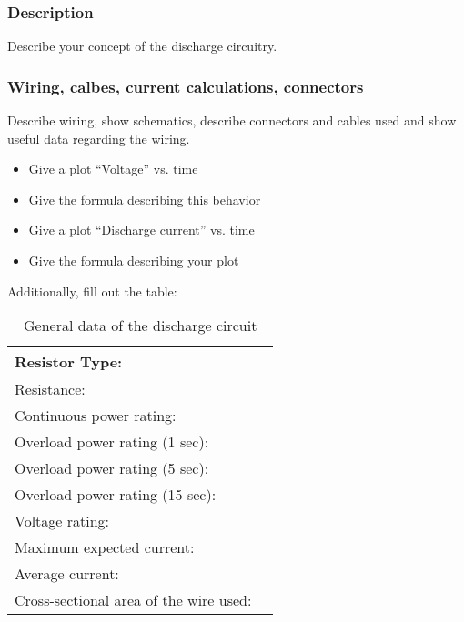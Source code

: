 \subsubsection{Description}
Describe your concept of the discharge circuitry.

\subsubsection{Wiring, calbes, current calculations, connectors}
Describe wiring, show schematics, describe connectors and cables used and show useful data regarding the wiring.
\begin{itemize}
	\item 	Give a plot “Voltage” vs. time
	\item 	Give the formula describing this behavior
	\item 	Give a plot “Discharge current” vs. time
	\item 	Give the formula describing your plot
\end{itemize}
Additionally, fill out the table:

\begin{table}[H]
	\centering
	\caption{General data of the discharge circuit}
	\begin{tabularx}{\textwidth}{|X|X|}
		\hline
		Resistor Type: &\\[\TableSize]
		\hline
		Resistance: & \\[\TableSize]
		\hline
		Continuous power rating: & \\[\TableSize]
		\hline
		Overload power rating (1 sec): & \\[\TableSize]
		\hline
		Overload power rating (5 sec): &  \\[\TableSize]
		\hline
		Overload power rating (15 sec): &  \\[\TableSize]
		\hline
		Voltage rating: &\\[\TableSize]
		\hline
		Maximum expected current: &\\[\TableSize]
		\hline
		Average current: &\\[\TableSize]
		\hline
		Cross-sectional area of the wire used: & \\[\TableSize]
		\hline
	\end{tabularx}%
	\label{tab:dischrage-circ}%
\end{table}%

